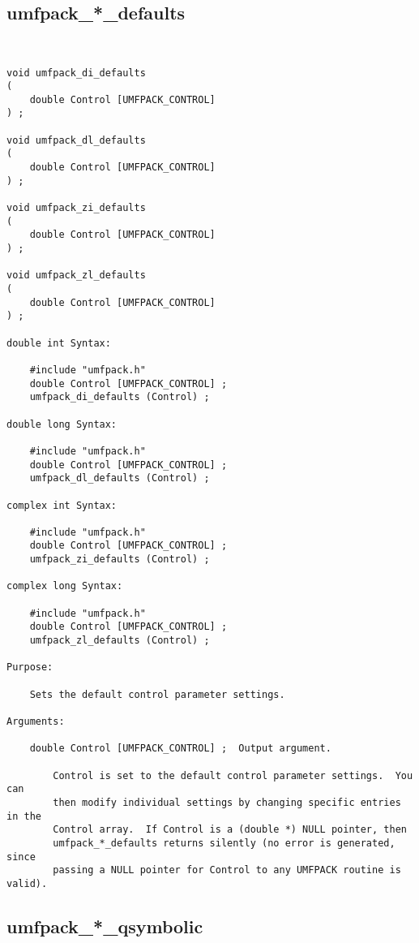 \subsection{umfpack\_*\_defaults}

{\footnotesize
\begin{verbatim}


void umfpack_di_defaults
(
    double Control [UMFPACK_CONTROL]
) ;

void umfpack_dl_defaults
(
    double Control [UMFPACK_CONTROL]
) ;

void umfpack_zi_defaults
(
    double Control [UMFPACK_CONTROL]
) ;

void umfpack_zl_defaults
(
    double Control [UMFPACK_CONTROL]
) ;

double int Syntax:

    #include "umfpack.h"
    double Control [UMFPACK_CONTROL] ;
    umfpack_di_defaults (Control) ;

double long Syntax:

    #include "umfpack.h"
    double Control [UMFPACK_CONTROL] ;
    umfpack_dl_defaults (Control) ;

complex int Syntax:

    #include "umfpack.h"
    double Control [UMFPACK_CONTROL] ;
    umfpack_zi_defaults (Control) ;

complex long Syntax:

    #include "umfpack.h"
    double Control [UMFPACK_CONTROL] ;
    umfpack_zl_defaults (Control) ;

Purpose:

    Sets the default control parameter settings.

Arguments:

    double Control [UMFPACK_CONTROL] ;  Output argument.

        Control is set to the default control parameter settings.  You can
        then modify individual settings by changing specific entries in the
        Control array.  If Control is a (double *) NULL pointer, then
        umfpack_*_defaults returns silently (no error is generated, since
        passing a NULL pointer for Control to any UMFPACK routine is valid).
\end{verbatim}
}

\newpage
\subsection{umfpack\_*\_qsymbolic}

